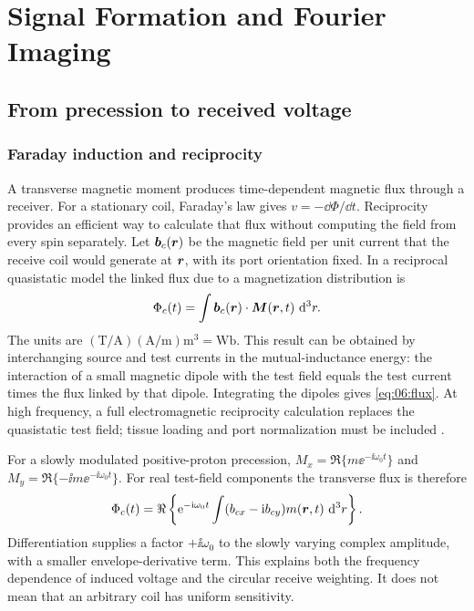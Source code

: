 \chapter{Signal Formation and Fourier Imaging}
\label{ch:06}
\section{From precession to received voltage}
\label{sec:06:from-precession-to-received-voltage}
\subsection{Faraday induction and reciprocity}
A transverse magnetic moment produces time-dependent magnetic flux through a receiver. For a stationary coil, Faraday's law gives \(v=-\dd\Phi/\dd t\). Reciprocity provides an efficient way to calculate that flux without computing the field from every spin separately. Let \(\bm{b}_c(\bm{r})\) be the magnetic field per unit current that the receive coil would generate at \(\bm{r}\), with its port orientation fixed. In a reciprocal quasistatic model the linked flux due to a magnetization distribution is
\begin{equation}
 \Phi_c(t)=\int \bm{b}_c(\bm{r})\cdot\bm{M}(\bm{r},t)\,\mathop{}\!\mathrm{d}^3r.
 \label{eq:06:flux}
\end{equation}
The units are \((\mathrm T/\mathrm A)(\mathrm A/\mathrm m)\mathrm m^3=\mathrm{Wb}\).
This result can be obtained by interchanging source and test currents in the mutual-inductance energy: the interaction of a small magnetic dipole with the test field equals the test current times the flux linked by that dipole. Integrating the dipoles gives \cref{eq:06:flux}. At high frequency, a full electromagnetic reciprocity calculation replaces the quasistatic test field; tissue loading and port normalization must be included \cite{hoult1976}.

For a slowly modulated positive-proton precession, \(M_x=\Re\{m\ee^{-\ii\omega_0t}\}\) and \(M_y=\Re\{-\ii m\ee^{-\ii\omega_0t}\}\). For real test-field components the transverse flux is therefore
\[
 \Phi_c(t)=\Re\left\{\mathrm{e}^{-\mathrm{i}\omega_0t}
 \int (b_{cx}-\mathrm{i} b_{cy})m(\bm{r},t)\,\mathop{}\!\mathrm{d}^3r\right\}.
\]
Differentiation supplies a factor \(+\ii\omega_0\) to the slowly varying complex amplitude, with a smaller envelope-derivative term. This explains both the frequency dependence of induced voltage and the circular receive weighting. It does not mean that an arbitrary coil has uniform sensitivity.

